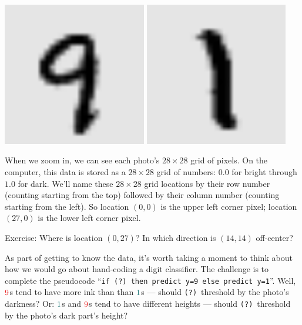 \documentclass[11pt, justified]{tufte-book}
\newcommand{\attn}[1]{{\bro \textsf{#1}}}
\theoremstyle{definition}
\begin{document}
        \begin{marginfigure}
          \vspace{-3.5cm}
          \includegraphics[width=0.47\textwidth]{example-mnist/mnist-trn-00}%
            \hspace{0.03\textwidth}
          \includegraphics[width=0.47\textwidth]{example-mnist/mnist-trn-01}%
        \end{marginfigure}
        When we zoom in, we can see each photo's $28\times 28$ grid of pixels.
        On the computer, this data is stored as a $28\times 28$ grid of
        numbers: $0.0$ for bright through $1.0$ for dark.  We'll name these
        $28\times28$ grid locations by their row number (counting starting from
        the top) followed by their column number (counting starting from the
        left).  So location $(0,0)$ is the upper left corner pixel; location
        $(27,0)$ is the lower left corner pixel.
        \par\noindent
        \attn{Exercise:} {Where is location $(0,27)$?  %
        In which direction is $(14,14)$ off-center?}

        
        As part of getting to know the data, it's worth taking a moment to
        think about how we would go about hand-coding a digit classifier.  The
        challenge is to complete the pseudocode
        ``\texttt{if (?)\ then predict y=9 else predict y=1}''.
        Well, ${\red{9}}$s tend to have more ink than than ${\cya{1}}$s ---
        should \texttt{(?)}\ threshold by the photo's darkness?
        Or: ${\cya{1}}$s and ${\red{9}}$s tend to have different heights ---
        should \texttt{(?)}\ threshold by the photo's dark part's height?
\end{document}
